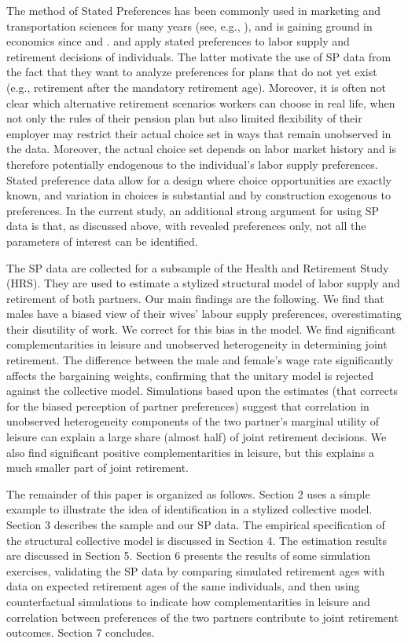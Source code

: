 \documentclass[11pt,letter]{article}
\begin{document}
The method of Stated Preferences has been commonly used in marketing and transportation sciences for many years (see, e.g., \citet{Louviere2000}), and is gaining ground in economics since \cite{Barsky1997} and \cite{Revelt1998}. \cite{Elsayed2018} and \cite{vsoest2014} apply stated preferences to labor supply and retirement decisions of individuals. The latter motivate the use of SP data from the fact that they want to analyze preferences for plans that do not yet exist (e.g., retirement after the mandatory retirement age). Moreover, it is often not clear which alternative retirement scenarios workers can choose in real life, when not only the rules of their pension plan but also limited flexibility of their employer may restrict their actual choice set in ways that remain unobserved in the data. Moreover, the actual choice set depends on labor market history and is therefore potentially endogenous to the individual's labor supply preferences. Stated preference data allow for a design where choice opportunities are exactly known, and variation in choices is substantial and by construction exogenous to preferences. In the current study, an additional strong argument for using SP data is that, as discussed above, with revealed preferences only, not all the parameters of interest can be identified.

\par The SP data are collected for a subsample of the Health and Retirement Study (HRS). They are used to estimate a stylized structural model of labor supply and retirement of both partners. Our main findings are the following. We find that males have a biased view of their wives' labour supply preferences, overestimating their disutility of work. We correct for this bias in the model. We find significant complementarities in leisure and unobserved heterogeneity in determining joint retirement. The difference between the male and female's wage rate significantly affects the bargaining weights, confirming that the unitary model is rejected against the collective model.
Simulations based upon the estimates (that corrects for the biased perception of partner preferences) suggest that correlation in unobserved heterogeneity components of the two partner's marginal utility of leisure can explain a large share (almost half) of joint retirement decisions. We also find significant positive complementarities in leisure, but this explains a much smaller part of joint retirement.

\par The remainder of this paper is organized as follows. Section 2 uses a simple example to illustrate the idea of identification in a stylized collective model. Section 3 describes the sample and our SP data. The empirical specification of the structural collective model is discussed in Section 4. The estimation results  are discussed in Section 5. Section 6 presents the results of some simulation exercises, validating the SP data by comparing simulated retirement ages with data on expected retirement ages of the same individuals, and then using counterfactual simulations to indicate how complementarities in leisure and correlation between preferences of the two partners contribute to joint retirement outcomes. Section 7 concludes.
\end{document}
